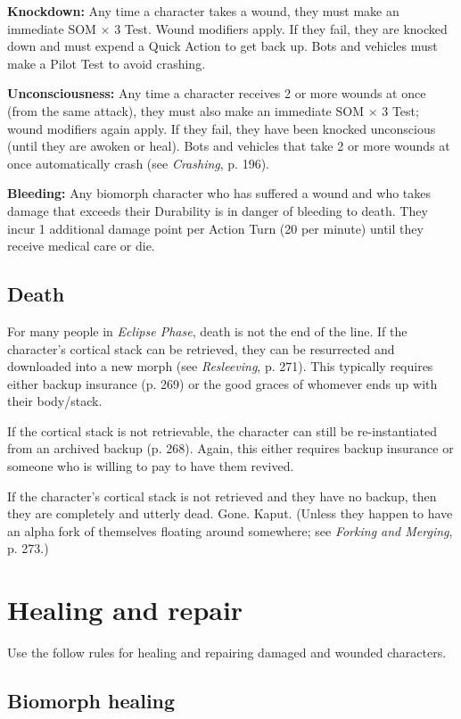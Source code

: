 \textbf{Knockdown:} Any time a character takes a wound, they must make an immediate SOM $\times$ 3 Test. Wound modifiers apply. If they fail, they are knocked down and must expend a Quick Action to get back up. Bots and vehicles must make a Pilot Test to avoid crashing.

\textbf{Unconsciousness:} Any time a character receives 2 or more wounds at once (from the same attack), they must also make an immediate SOM $\times$ 3 Test; wound modifiers again apply. If they fail, they have been knocked unconscious (until they are awoken or heal). Bots and vehicles that take 2 or more wounds at once automatically crash (see \emph{Crashing}, p. 196).

\textbf{Bleeding:} Any biomorph character who has suffered a wound and who takes damage that exceeds their Durability is in danger of bleeding to death. They incur 1 additional damage point per Action Turn (20 per minute) until they receive medical care or die.

\subsection{Death} For many people in \emph{Eclipse Phase}, death is not the end of the line. If the character’s cortical stack can be retrieved, they can be resurrected and downloaded into a new morph (see \emph{Resleeving}, p. 271). This typically requires either backup insurance (p. 269) or the good graces of whomever ends up with their body/stack.

If the cortical stack is not retrievable, the character can still be re-instantiated from an archived backup (p. 268). Again, this either requires backup insurance or someone who is willing to pay to have them revived.

If the character’s cortical stack is not retrieved and they have no backup, then they are completely and utterly dead. Gone. Kaput. (Unless they happen to have an alpha fork of themselves floating around somewhere; see \emph{Forking and Merging}, p. 273.)


\section{Healing and repair}
\label{sec:healing-repair}

Use the follow rules for healing and repairing damaged and wounded characters.

\subsection{Biomorph healing}

